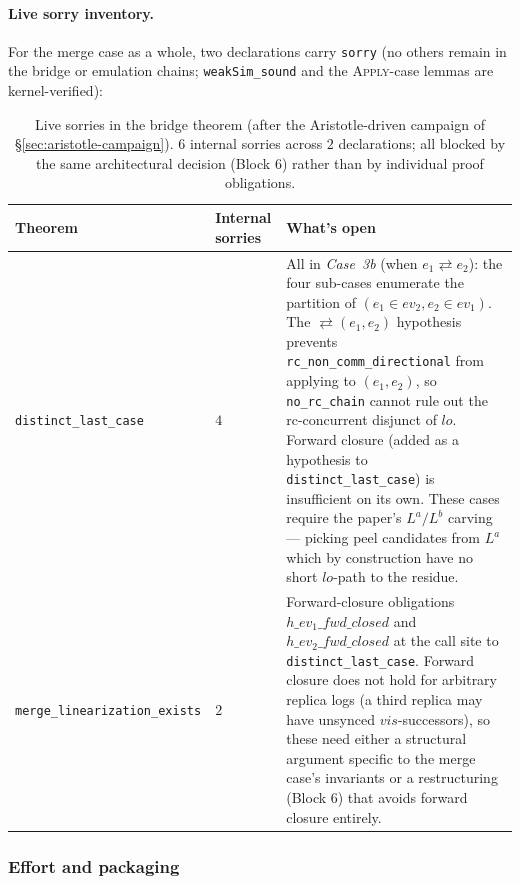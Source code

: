 \documentclass[11pt,a4paper]{article}
\theoremstyle{definition}
\theoremstyle{remark}
\newcommand{\ev}{\mathit{ev}}
\newcommand{\commute}{\mathrel{\rightleftarrows}}
\begin{document}
\paragraph{Live sorry inventory.}
For the merge case as a whole, two declarations carry
\texttt{sorry} (no others remain in the bridge or emulation
chains; \texttt{weakSim\_sound} and the \textsc{Apply}-case
lemmas are kernel-verified):

\begin{table}[h]
  \centering
  \small
  \begin{tabular}{@{}llp{6.5cm}@{}}
    \toprule
    Theorem & Internal sorries & What's open \\
    \midrule
    \texttt{distinct\_last\_case}
      & $4$
      & All in \emph{Case~3b} (when $e_1 \commute e_2$): the four
        sub-cases enumerate the partition of $(e_1 \in \ev_2,
        e_2 \in \ev_1)$. The $\commute(e_1, e_2)$ hypothesis
        prevents \texttt{rc\_non\_comm\_directional} from applying
        to $(e_1, e_2)$, so \texttt{no\_rc\_chain} cannot rule out
        the rc-concurrent disjunct of $\mathit{lo}$. Forward
        closure (added as a hypothesis to \texttt{distinct\_last\_case})
        is insufficient on its own. These cases require the
        paper's $L^a / L^b$ carving — picking peel candidates
        from $L^a$ which by construction have no short
        $\mathit{lo}$-path to the residue. \\
    \texttt{merge\_linearization\_exists}
      & $2$
      & Forward-closure obligations $h\_ev_1\_fwd\_closed$ and
        $h\_ev_2\_fwd\_closed$ at the call site to
        \texttt{distinct\_last\_case}. Forward closure does not
        hold for arbitrary replica logs (a third replica may have
        unsynced $\mathit{vis}$-successors), so these need either
        a structural argument specific to the merge case's
        invariants or a restructuring (Block 6) that avoids
        forward closure entirely. \\
    \bottomrule
  \end{tabular}
  \caption{Live sorries in the bridge theorem (after the
  Aristotle-driven campaign of \S\ref{sec:aristotle-campaign}).
  $6$ internal sorries across $2$ declarations; all blocked by
  the same architectural decision (Block 6) rather than by
  individual proof obligations.}
  \label{tab:sorries}
\end{table}

\subsubsection{Effort and packaging}
\label{sec:merge-effort}
\end{document}
